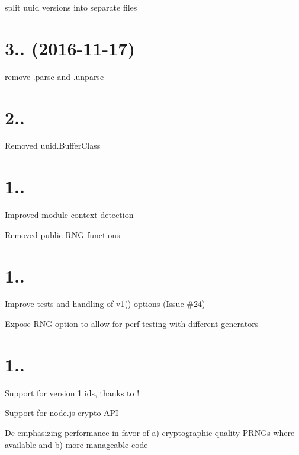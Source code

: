 
\begin{DoxyItemize}
\item split uuid versions into separate files
\end{DoxyItemize}

\section*{3.. (2016-\/11-\/17)}


\begin{DoxyItemize}
\item remove .parse and .unparse
\end{DoxyItemize}

\section*{2..}


\begin{DoxyItemize}
\item Removed uuid.\+Buffer\+Class
\end{DoxyItemize}

\section*{1..}


\begin{DoxyItemize}
\item Improved module context detection
\item Removed public R\+NG functions
\end{DoxyItemize}

\section*{1..}


\begin{DoxyItemize}
\item Improve tests and handling of v1() options (Issue \#24)
\item Expose R\+NG option to allow for perf testing with different generators
\end{DoxyItemize}

\section*{1..}


\begin{DoxyItemize}
\item Support for version 1 ids, thanks to \href{https://github.com/ctavan}{\tt }!
\item Support for node.\+js crypto A\+PI
\item De-\/emphasizing performance in favor of a) cryptographic quality P\+R\+N\+Gs where available and b) more manageable code 
\end{DoxyItemize}